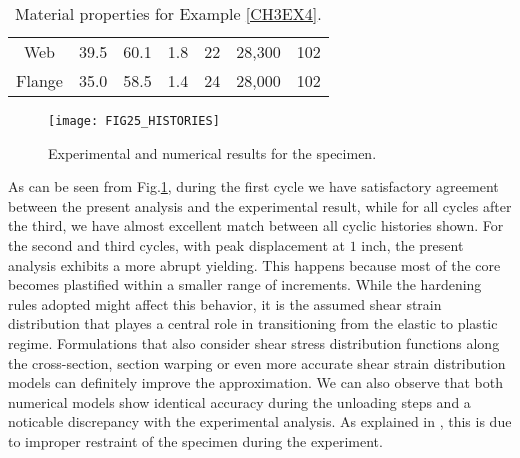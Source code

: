 \begin{table}[b]
	\centering
	\begin{minipage}{0.8\linewidth}
		\caption{Material properties for Example \ref{CH3EX4}.}
		\begin{tabular}{ccccccc}
			\toprule\toprule
			\vtop{\hbox{\strut \hspace{.25cm}Section}\hbox{\strut W 
			$18\times40$}} 
			& \vtop{\hbox{\strut \hspace{0.5cm}$\sigma_y$}\hbox{\strut 
					($\text{kips}^{}/\text{in}^2$)}}  &         
					\vtop{\hbox{\strut 
					\hspace{0.5cm}$\sigma_u$}\hbox{\strut 
					($\text{kips}^{}/\text{in}^2$)}} &
			\vtop{\hbox{\strut \hspace{2.5pt}$\epsilon_y$}\hbox{\strut (\%)}} & 
			\vtop{\hbox{\strut \hspace{2.5pt}$\epsilon_u$}\hbox{\strut (\%)}} 
			&\vtop{\hbox{\strut \hspace{0.5cm}$E$}\hbox{\strut 
					($\text{kips}^{}/\text{in}^2$)}} & \vtop{\hbox{\strut 
					\hspace{0.4cm}$H_{kin}$}\hbox{\strut 
					($\text{kips}^{}/\text{in}^2$)}} \\
			\midrule
			Web & 39.5 & 60.1 & 1.8 & 22 & 28,300 & 102 \\
			Flange & 35.0 & 58.5 & 1.4 & 24 & 28,000 & 102\\
			\bottomrule\bottomrule
		\end{tabular}
		\label{table:TABLE6}
	\end{minipage}
\end{table}

\begin{figure}[t]
	\centering
	\texttt{[image: FIG25\_HISTORIES]}
	\caption{Experimental and numerical results for the specimen.}
	\label{fig:FIG25}
\end{figure}

As can be seen from Fig.\ref{fig:FIG25}, during the first cycle we have 
satisfactory agreement between the present analysis and the experimental 
result, while for all cycles after the third, we have almost excellent match 
between all cyclic histories shown. For the second and third cycles, with peak 
displacement at $1$ inch, the present analysis exhibits a more abrupt yielding. 
This happens because most of the core becomes plastified within a smaller range 
of increments. While the hardening rules adopted might affect this behavior, it 
is the assumed shear strain distribution that playes a central role in 
transitioning from the elastic to plastic regime. Formulations that also 
consider shear stress distribution functions along the cross-section, section 
warping or even more accurate shear strain distribution models can definitely 
improve the approximation. We can also observe that both numerical models show 
identical accuracy during the unloading steps and a noticable discrepancy with 
the experimental analysis. As explained in \cite{Saritas2009}, this is due to 
improper restraint of the specimen during the experiment.

